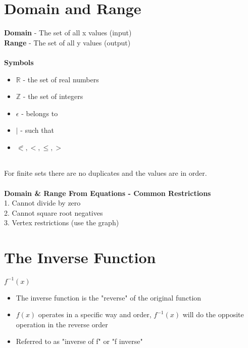 \documentclass{article}
\begin{document}

\newpage
\section{Domain and Range}

\textbf{Domain} - The set of all x values (input) \\
\textbf{Range} - The set of all y values (output) \\\\
\textbf{Symbols}
\begin{itemize}
    \item $\mathbb{R}$ - the set of real numbers
    \item $\mathbb{Z}$ - the set of integers
    \item $\epsilon$ - belongs to
    \item $\mid$ - such that
    \item $\eqslantless, <, \leqslant, >$
\end{itemize}

\noindent
\\For finite sets there are no duplicates and the values are in order.\\\\

\noindent
\textbf{Domain \& Range From Equations - Common Restrictions}\\
1. Cannot divide by zero\\
2. Cannot square root negatives\\
3. Vertex restrictions (use the graph)\\


\newpage
\section{The Inverse Function}

$f^{-1}(x)$
\begin{itemize}
    \item The inverse function is the "reverse" of the original function
    \item $f(x)$ operates in a specific way and order, $f^{-1}(x)$ will do the opposite operation in the reverse order
    \item Referred to as "inverse of f" or "f inverse"
\end{itemize} 
\end{document}
